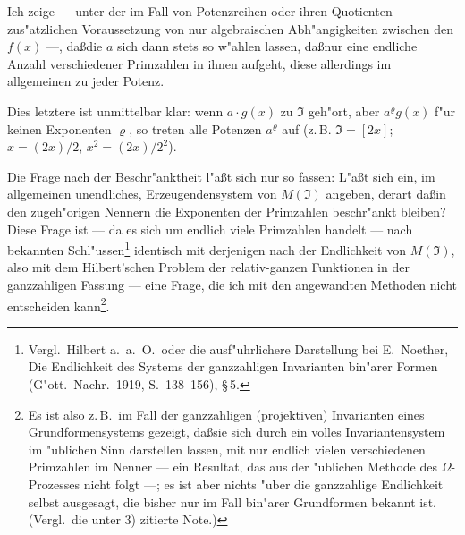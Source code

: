 Ich zeige --- unter der im Fall von Potenzreihen oder ihren Quotienten zus"atzlichen Voraussetzung von nur algebraischen Abh"angigkeiten zwischen den $f(x)$ ---, da\ss die $a$ sich dann stets so w"ahlen lassen, da\ss nur eine endliche Anzahl verschiedener Primzahlen in ihnen aufgeht, diese allerdings im allgemeinen zu jeder Potenz.

Dies letztere ist unmittelbar klar: wenn $a \cdot g(x)$ zu $\mathfrak{I}$ geh"ort, aber $a^\varrho g(x)$ f"ur keinen Exponenten $\varrho$, so treten alle Potenzen $a^\varrho$ auf (z.\,B. $\mathfrak{I} = [2x]$; $x = (2x)/2$, $x^2 = (2x)/2^2$).

Die Frage nach der Beschr"anktheit l"a\ss t sich nur so fassen: L"a\ss t sich ein, im allgemeinen unendliches, Erzeugendensystem von $M(\mathfrak{I})$ angeben, derart da\ss in den zugeh"origen Nennern die Exponenten der Primzahlen beschr"ankt bleiben? Diese Frage ist --- da es sich um endlich viele Primzahlen handelt --- nach bekannten Schl"ussen\footnote{Vergl.\ Hilbert a.\ a.\ O.\ oder die ausf"uhrlichere Darstellung bei E.\ Noether, Die Endlichkeit des Systems der ganzzahligen Invarianten bin"arer Formen (G"ott.\ Nachr.\ 1919, S.\ 138--156), \S\,5.} identisch mit derjenigen nach der Endlichkeit von $M(\mathfrak{I})$, also mit dem Hilbert'schen Problem der relativ-ganzen Funktionen in der ganzzahligen Fassung --- eine Frage, die ich mit den angewandten Methoden nicht entscheiden kann\footnote{Es ist also z.\,B.\ im Fall der ganzzahligen (projektiven) Invarianten eines Grundformensystems gezeigt, da\ss sie sich durch ein volles Invariantensystem im "ublichen Sinn darstellen lassen, mit nur endlich vielen verschiedenen Primzahlen im Nenner --- ein Resultat, das aus der "ublichen Methode des $\Omega$-Prozesses nicht folgt ---; es ist aber nichts "uber die ganzzahlige Endlichkeit selbst ausgesagt, die bisher nur im Fall bin"arer Grundformen bekannt ist. (Vergl.\ die unter 3) zitierte Note.)}.

